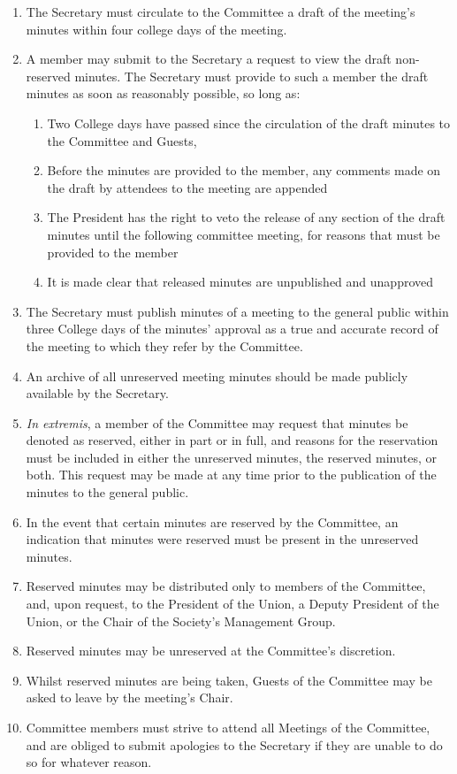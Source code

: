 \documentclass[a4paper]{tufte-handout}
\begin{document}
\begin{enumerate}[resume]
    \item The Secretary must circulate to the Committee a draft of the meeting's minutes within four college days of the meeting.
    \item A member may submit to the Secretary a request to view the draft non-reserved minutes. The Secretary must provide to such a member the draft minutes as soon as reasonably possible, so long as:
        \begin{enumerate}
            \item Two College days have passed since the circulation of the draft minutes to the Committee and Guests,
            \item Before the minutes are provided to the member, any comments made on the draft by attendees to the meeting are appended
            \item The President has the right to veto the release of any section of the draft minutes until the following committee meeting, for reasons that must be provided to the member
            \item It is made clear that released minutes are unpublished and unapproved
        \end{enumerate}
    \item The Secretary must publish minutes of a meeting to the general public within three College days of the minutes' approval as a true and accurate record of the meeting to which they refer by the Committee.
    \item An archive of all unreserved meeting minutes should be made publicly available by the Secretary.
    \item \textit{In extremis}, a member of the Committee may request that minutes be denoted as reserved, either in part or in full, and reasons for the reservation must be included in either the unreserved minutes, the reserved minutes, or both. This request may be made at any time prior to the publication of the minutes to the general public.
    \item In the event that certain minutes are reserved by the Committee, an indication that minutes were reserved must be present in the unreserved minutes.
    \item Reserved minutes may be distributed only to members of the Committee, and, upon request, to the President of the Union, a Deputy President of the Union, or the Chair of the Society's Management Group.
    \item Reserved minutes may be unreserved at the Committee's discretion.
    \item Whilst reserved minutes are being taken, Guests of the Committee may be asked to leave by the meeting's Chair.
    \item Committee members must strive to attend all Meetings of the Committee, and are obliged to submit apologies to the Secretary if they are unable to do so for whatever reason.
\end{enumerate}
\end{document}
